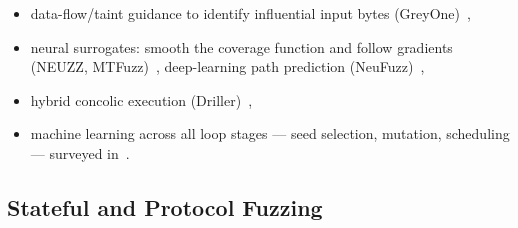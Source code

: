\begin{itemize}
    \begin{itemize}
      \item data-flow/taint guidance to identify influential input bytes
        (GreyOne)~\cite{gan_greyone_nodate},
      \item neural surrogates: smooth the coverage function and follow gradients (NEUZZ,
        MTFuzz)~\cite{she_neuzz_2019,she_mtfuzz_2020}, deep-learning path prediction
        (NeuFuzz)~\cite{wang_neufuzz_2019},
      \item hybrid concolic execution (Driller)~\cite{stephens_driller_2016},
      \item machine learning across all loop stages --- seed selection, mutation, scheduling ---
        surveyed in~\cite{wang_systematic_2020,qiu_survey_2025}.
    \end{itemize}
\end{itemize}

\subsection{Stateful and Protocol Fuzzing}\label{sec:fuzzing-stateful}

